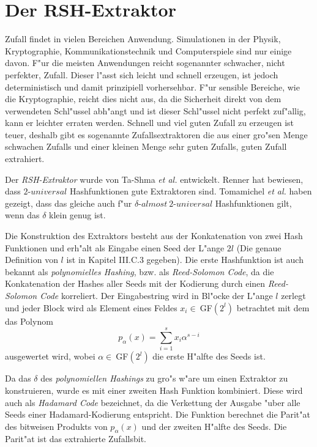 \section{Der RSH-Extraktor}

Zufall findet in vielen Bereichen Anwendung. Simulationen in der Physik, Kryptographie, Kommunikationstechnik und Computerspiele sind nur einige davon. F"ur die meisten Anwendungen reicht sogenannter schwacher, nicht perfekter, Zufall. Dieser l"asst sich leicht und schnell erzeugen, ist jedoch deterministisch und damit prinzipiell vorhersehbar. F"ur sensible Bereiche, wie die Kryptographie, reicht dies nicht aus, da die Sicherheit direkt von dem verwendeten Schl"ussel abh"angt und ist dieser Schl"ussel nicht perfekt zuf"allig, kann er leichter erraten werden. Schnell und viel guten Zufall zu erzeugen ist teuer, deshalb gibt es sogenannte Zufallsextraktoren die aus einer gro"sen Menge schwachen Zufalls und einer kleinen Menge sehr guten Zufalls, guten Zufall extrahiert.

Der \emph{RSH-Extraktor} wurde von Ta-Shma \emph{et al.} \cite{ta2004extractor} entwickelt. Renner \cite{renner2008security} hat bewiesen, dass $2$-$universal$ Hashfunktionen gute Extraktoren sind. Tomamichel \emph{et al.} \cite{tomamichel2011leftover} haben gezeigt, dass das gleiche auch f"ur $\delta$-$almost\ 2$-$universal$ Hashfunktionen gilt, wenn das $\delta$ klein genug ist.

Die Konstruktion des Extraktors besteht aus der Konkatenation von zwei Hash Funktionen und erh"alt als Eingabe einen Seed der L"ange $2l$ (Die genaue Definition von $l$ ist in \cite{mauerer2012modular} Kapitel III.C.3 gegeben). Die erste Hashfunktion ist auch bekannt als \emph{polynomielles Hashing}, bzw. als \emph{Reed-Solomon Code}, da die Konkatenation der Hashes aller Seeds mit der Kodierung durch einen \emph{Reed-Solomon Code} korreliert. Der Eingabestring wird in Bl"ocke der L"ange $l$ zerlegt und jeder Block wird als Element eines Feldes $x_i \in\ $GF$(2^l)$ betrachtet mit dem das Polynom
\begin{equation}
	p_\alpha(x) = \sum_{i=1}^{s} x_i \alpha ^{s-i}
\end{equation}
ausgewertet wird, wobei $\alpha \in\ $GF$(2^l)$ die erste H"alfte des Seeds ist.

Da das $\delta$ des \emph{polynomiellen Hashings} zu gro"s w"are um einen Extraktor zu konstruieren, wurde es mit einer zweiten Hash Funktion kombiniert. Diese wird auch als \emph{Hadamard Code} bezeichnet, da die Verkettung der Ausgabe "uber alle Seeds einer Hadamard-Kodierung entspricht. Die Funktion berechnet die Parit"at des bitweisen Produkts von $p_\alpha(x)$ und der zweiten H"alfte des Seeds. Die Parit"at ist das extrahierte Zufallsbit.

